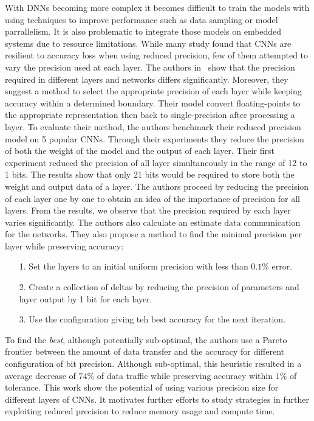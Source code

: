 With DNNs becoming more complex it becomes difficult to train the models with using 
techniques to improve performance such as data sampling or model parrallelism.
It is also problematic to integrate those models on embedded systems due to resource limitations.
While many study found that CNNs are resilient to accuracy loss when using reduced precision,
few of them attempted to vary the precision used at each layer.
The authors in~\cite{Judd2015-kw} show that the precision required in different layers and networks
differs significantly.
Moreover, they suggest a method to select the appropriate precision of each layer while 
keeping accuracy within a determined boundary.
Their model convert floating-points to the appropriate representation then back to single-precision after processing a layer.
To evaluate their method, the authors benchmark their reduced precision model on 5 popular CNNs.
Through their experiments they reduce the precision of both the weight of the model and the output of each layer.
Their first experiment reduced the precision of all layer simultaneously in the range of 12 to 1 bits.
The results show that only 21 bits would be required to store both the weight and output data of a layer.
The authors proceed by reducing the precision of each layer one by one to obtain an idea of the importance of precision for all layers.
From the results, we observe that the precision required by each layer varies significantly.
The authors also calculate an estimate data communication for the networks.
They also propose a method to find the minimal precision per layer while preserving accuracy:
\begin{itemize}
	\item[1.] Set the layers to an initial uniform precision with less than $0.1\%$ error.
	\item[2.] Create a collection of deltas by reducing the precision of parameters and layer output by 1 bit for each layer.
	\item[3.] Use the configuration giving teh best accuracy for the next iteration.
\end{itemize}
To find the \textit{best}, although potentially sub-optimal, the authors use a Pareto
frontier between the amount of data transfer and the accuracy for different configuration of bit precision.
Although sub-optimal, this heuristic resulted in a average decrease of $74\%$ of data traffic
while preserving accuracy within $1\%$ of tolerance.
This work show the potential of using various precision size for different layers of CNNs.
It motivates further efforts to study strategies in further exploiting reduced precision
to reduce memory usage and compute time. 

